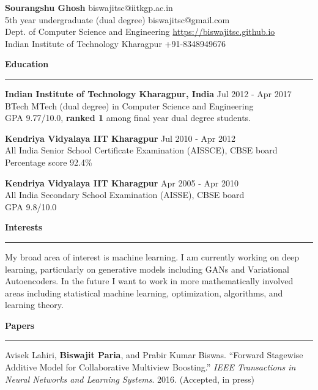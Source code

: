 \documentclass[10pt]{article}
\newcommand{\heading}[1]{
 {\large \textbf{#1}}
  \vspace{0.4em}
  \hrule
  \vspace{0.4em}
}
\newcommand{\EntryGap}{\vspace{0.4	cm}}
\newcommand{\SmallEntryGap}{\vspace{0.2cm}}
\begin{document}

{\Large \textbf{Sourangshu Ghosh}} \hfill biswajitsc@iitkgp.ac.in\\
5th year undergraduate (dual degree) \hfill biswajitsc@gmail.com\\
Dept. of Computer Science and Engineering \hfill \url{https://biswajitsc.github.io}\\
Indian Institute of Technology Kharagpur \hfill  +91-8348949676  
\EntryGap



\heading{Education}

\textbf{Indian Institute of Technology Kharagpur, India} \hfill Jul 2012 - Apr 2017\\
BTech MTech (dual degree) in Computer Science and Engineering\\
GPA 9.77/10.0, \textbf{ranked 1} among final year dual degree students.

\SmallEntryGap
\textbf{Kendriya Vidyalaya IIT Kharagpur} \hfill Jul 2010 - Apr 2012\\
All India Senior School Certificate Examination (AISSCE), CBSE board\\
Percentage score 92.4\%

\SmallEntryGap
\textbf{Kendriya Vidyalaya IIT Kharagpur} \hfill Apr 2005 - Apr 2010\\
All India Secondary School Examination (AISSE), CBSE board\\
GPA 9.8/10.0

\EntryGap
\heading{Interests}

My broad area of interest is machine learning. I am currently working on deep learning,
particularly on generative models including GANs and Variational Autoencoders.
In the future I want to work in more mathematically involved areas including statistical
machine learning, optimization, algorithms, and learning theory.


\EntryGap

\heading{Papers}
  
  Avisek Lahiri, \textbf{Biswajit Paria}, and Prabir Kumar Biswas. 
  ``Forward Stagewise Additive Model for Collaborative Multiview Boosting.''
  \emph{IEEE Transactions in Neural Networks and Learning Systems}. 2016.
  (Accepted, in press)
  
\end{document}
